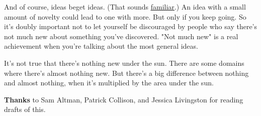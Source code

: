 And
                  of course, ideas beget ideas. (That sounds
                  \href{http://www.paulgraham.com/ecw.html}{\underline{familiar}}.) An idea with a small amount of novelty could lead to one
                  with more. But only if you keep going. So it's doubly
                  important not to let yourself be discouraged by people who say
                  there's not much new about something you've discovered. "Not
                  much new" is a real achievement when you're talking about the
                  most general ideas.
                  

It's not true that there's nothing new
                  under the sun. There are some domains where there's almost
                  nothing new. But there's a big difference between nothing and
                  almost nothing, when it's multiplied by the area under the
                  sun.






                  \textbf{Thanks} to Sam Altman, Patrick Collison, and Jessica
                  Livingston for reading drafts of this.


              
            
          
